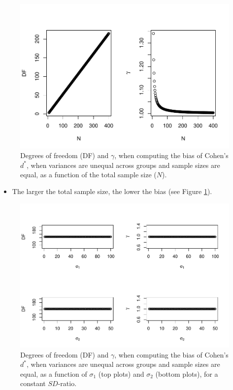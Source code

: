 \documentclass[
  english,
  man,mask]{apa6}
\providecommand{\tightlist}{%
  \setlength{\itemsep}{0pt}\setlength{\parskip}{0pt}}
\begin{document}
\begin{figure}
\centering
\includegraphics{SupMat1_files/figure-latex/biascohendprimehetbalNsize2-1.pdf}
\caption{\label{fig:biascohendprimehetbalNsize2}Degrees of freedom (DF) and \(\gamma\), when computing the bias of Cohen's \(d^*\), when variances are unequal across groups and sample sizes are equal, as a function of the total sample size (\(N\)).}
\end{figure}

\begin{itemize}
\tightlist
\item
  The larger the total sample size, the lower the bias (see Figure \ref{fig:biascohendprimehetbalNsize2}).
\end{itemize}

\begin{figure}
\centering
\includegraphics{SupMat1_files/figure-latex/biascohendprimehetbalvariance2-1.pdf}
\caption{\label{fig:biascohendprimehetbalvariance2}Degrees of freedom (DF) and \(\gamma\), when computing the bias of Cohen's \(d^*\), when variances are unequal across groups and sample sizes are equal, as a function of \(\sigma_1\) (top plots) and \(\sigma_2\) (bottom plots), for a constant \(SD\)-ratio.}
\end{figure}
\end{document}
